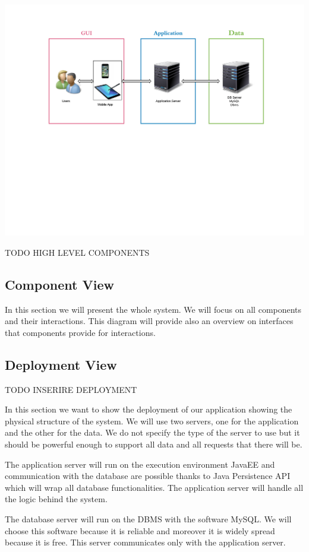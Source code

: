 \documentclass[12pt,titlepage]{article}
\begin{document}
\includegraphics[scale=0.5]{"General Architecture - Page 1"}

TODO HIGH LEVEL COMPONENTS
\subsection{Component View}
In this section we will present the whole system. We will focus on all components and their interactions. This diagram will provide also an overview on interfaces that components provide for interactions.
\subsection{Deployment View}
TODO INSERIRE DEPLOYMENT

In  this section we want to show the deployment of our application showing the physical structure of the system.
We will use two servers, one for the application and the other for the data. We do not specify the type of the server to use but it should be powerful enough to support all data and all requests that there will be.

The application server will run on the execution environment JavaEE and communication with the database are possible thanks to Java Persistence API which will wrap all database functionalities.
The application server will handle all the logic behind the system.

The database server will run on the DBMS with the software MySQL. We will choose this software because it is reliable and moreover it is widely spread because it is free. This server communicates only with the application server.
\end{document}

